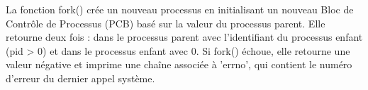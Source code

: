 \documentclass[12pt]{report}
\begin{document}
\begin{tcolorbox}[ 
  colback=yellow!10, 
  colframe=yellow, 
  title={\fontfamily{lmr}\selectfont \faBookmark À retenir}, 
  fonttitle=\bfseries, 
  fontupper=\fontfamily{lmr}\selectfont, 
  boxrule=1pt, 
  sharp corners, 
  ] 
 La fonction fork() crée un nouveau processus en initialisant un nouveau Bloc de Contrôle de Processus (PCB) basé sur la valeur du processus parent. Elle retourne deux fois : dans le processus parent avec l'identifiant du processus enfant (pid > 0) et dans le processus enfant avec 0. Si fork() échoue, elle retourne une valeur négative et imprime une chaîne associée à 'errno', qui contient le numéro d'erreur du dernier appel système. 
 \end{tcolorbox}
\end{document}
